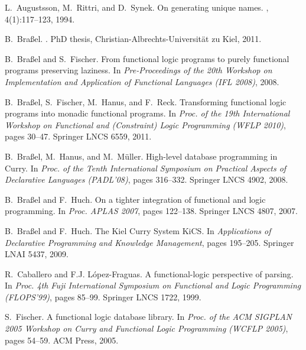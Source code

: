 \documentclass{llncs}
\begin{document}
\begin{thebibliography}{10}
L.~Augustsson, M.~Rittri, and D.~Synek.
\newblock On generating unique names.
, 4(1):117--123, 1994.

B.~Bra{\ss}el.
.
\newblock PhD thesis, Christian-Albrechts-Universit{\"a}t zu Kiel, 2011.

B.~Bra{\ss}el and S.~Fischer.
\newblock From functional logic programs to purely functional programs
  preserving laziness.
\newblock In {\em Pre-Proceedings of the 20th Workshop on Implementation and
  Application of Functional Languages (IFL 2008)}, 2008.

B.~Bra{\ss}el, S.~Fischer, M.~Hanus, and F.~Reck.
\newblock Transforming functional logic programs into monadic functional
  programs.
\newblock In {\em Proc. of the 19th International Workshop on Functional and
  (Constraint) Logic Programming (WFLP 2010)}, pages 30--47. Springer LNCS
  6559, 2011.

B.~Bra{\ss}el, M.~Hanus, and M.~M{\"u}ller.
\newblock High-level database programming in {Curry}.
\newblock In {\em Proc. of the Tenth International Symposium on Practical
  Aspects of Declarative Languages (PADL'08)}, pages 316--332. Springer LNCS
  4902, 2008.

B.~Bra{\ss}el and F.~Huch.
\newblock On a tighter integration of functional and logic programming.
\newblock In {\em Proc. APLAS 2007}, pages 122--138. Springer LNCS 4807, 2007.

B.~Bra{\ss}el and F.~Huch.
\newblock The {Kiel} {Curry} {System} {KiCS}.
\newblock In {\em Applications of Declarative Programming and Knowledge
  Management}, pages 195--205. Springer LNAI 5437, 2009.

R.~Caballero and F.J. L{\'o}pez-Fraguas.
\newblock A functional-logic perspective of parsing.
\newblock In {\em Proc. 4th Fuji International Symposium on Functional and
  Logic Programming (FLOPS'99)}, pages 85--99. Springer LNCS 1722, 1999.

S.~Fischer.
\newblock A functional logic database library.
\newblock In {\em Proc. of the ACM SIGPLAN 2005 Workshop on Curry and
  Functional Logic Programming (WCFLP 2005)}, pages 54--59. ACM Press, 2005.


\end{thebibliography}
\end{document}

